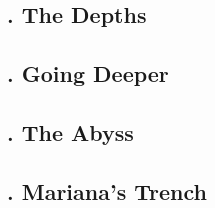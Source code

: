 \documentclass[letterpaper, 12pt]{article}
\begin{document}
\subsection*{{. The Depths}} \justify

\subsection*{{. Going Deeper}} \justify

\subsection*{{. The Abyss}} \justify

\subsection*{{. Mariana's Trench}} \justify
\end{document}
